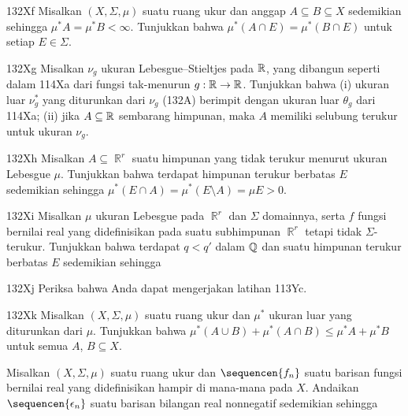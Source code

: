 {\spheader 132Xf Misalkan $(X,\Sigma,\mu)$ suatu ruang ukur dan anggap
$A\subseteq B\subseteq X$ sedemikian sehingga $\mu^*A=\mu^*B<\infty$.
Tunjukkan bahwa $\mu^*(A\cap E)=\mu^*(B\cap E)$ untuk setiap $E\in\Sigma$.

\sqheader 132Xg Misalkan $\nu_g$ ukuran Lebesgue–Stieltjes pada $\Bbb R$,
yang dibangun seperti dalam 114Xa dari fungsi tak-menurun
$g:\Bbb R\to\Bbb R$. Tunjukkan bahwa
(i) ukuran luar $\nu_g^*$ yang diturunkan dari $\nu_g$ (132A) berimpit dengan
ukuran luar $\theta_g$ dari 114Xa;
(ii) jika $A\subseteq\Bbb R$ sembarang himpunan, maka $A$ memiliki selubung
terukur untuk ukuran $\nu_g$.

\sqheader 132Xh Misalkan $A\subseteq\BbbR^r$ suatu himpunan yang tidak
terukur menurut ukuran Lebesgue $\mu$. Tunjukkan bahwa terdapat himpunan
terukur berbatas $E$ sedemikian sehingga
$\mu^*(E\cap A)=\mu^*(E\setminus A)=\mu E>0$.

\spheader 132Xi Misalkan $\mu$ ukuran Lebesgue pada $\BbbR^r$ dan $\Sigma$
domainnya, serta $f$ fungsi bernilai real yang didefinisikan pada suatu
subhimpunan $\BbbR^r$ tetapi tidak $\Sigma$-terukur. Tunjukkan bahwa terdapat
$q<q'$ dalam $\Bbb Q$ dan suatu himpunan terukur berbatas $E$ sedemikian
sehingga


\noindent {}

\spheader 132Xj Periksa bahwa Anda dapat mengerjakan latihan 113Yc.

\spheader 132Xk Misalkan $(X,\Sigma,\mu)$ suatu ruang ukur dan $\mu^*$ ukuran
luar yang diturunkan dari $\mu$. Tunjukkan bahwa
$\mu^*(A\cup B)+\mu^*(A\cap B)\le\mu^*A+\mu^*B$
untuk semua $A$, $B\subseteq X$.

Misalkan $(X,\Sigma,\mu)$ suatu ruang ukur dan $\sequencen{f_n}$ suatu
barisan fungsi bernilai real yang didefinisikan hampir di mana-mana pada
$X$. Andaikan $\sequencen{\epsilon_n}$ suatu barisan bilangan real
nonnegatif sedemikian sehingga

}
